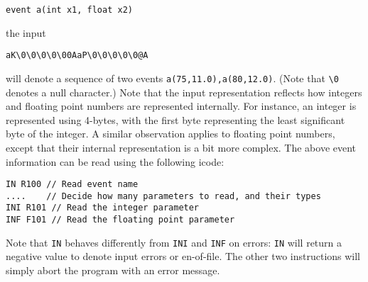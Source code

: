 \documentclass[10pt]{article}
\begin{document}
\begin{verbatim}
event a(int x1, float x2)
\end{verbatim}

the input
\begin{verbatim}
aK\0\0\0\0\00AaP\0\0\0\0\0@A
\end{verbatim}
will denote a sequence of two events \verb+a(75,11.0),a(80,12.0)+. (Note
that \verb+\0+ denotes a null character.) Note that the input
representation reflects how integers and floating point numbers are
represented internally. For instance, an integer is represented using
4-bytes, with the first byte representing the least significant byte of
the integer. A similar observation applies to floating point numbers,
except that their internal representation is a bit more complex. The above
event information can be read using the following icode:

\begin{verbatim}
IN R100 // Read event name
....    // Decide how many parameters to read, and their types
INI R101 // Read the integer parameter
INF F101 // Read the floating point parameter
\end{verbatim}

Note that \verb+IN+ behaves differently from \verb+INI+ and \verb+INF+ 
on errors: \verb+IN+ will return a negative value to denote input
errors or en-of-file. The other two instructions will simply abort the
program with an error message.
\end{document}
